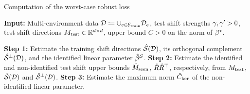 \begin{algorithm}[h!]
    \caption{Computation of the worst-case robust loss} \label{alg:id-rob-loss}
    \begin{algorithmic}[1]
    \State \textbf{Input:} Multi-environment data $\mathcal{D} \coloneqq \cup_{e \in \mathcal{E}_{\mathrm{train}}} \mathcal{D}_e$, test shift strengths $\gamma, \gamma' > 0$, test shift directions $M_{\mathrm{test}} \in \mathbb{R}^{d \times d}$, upper bound $C > 0$ on the norm of $\beta^{\star}$.
    
    \State \textbf{Step 1:} Estimate the training shift directions $\hat{\mathcal{S}}(\mathcal{D})$, its  orthogonal complement $\hat{\mathcal{S}}^\perp(\mathcal{D})$, and the identified linear parameter $\hat{\beta}^{\mathcal{S}}$.
    \State \textbf{Step 2:} Estimate the identified and non-identified test shift upper bounds $\hat{M}_{\mathrm{seen}}$, $\hat{R} \hat{R}^\top$, respectively, from $M_{\mathrm{test}}$, $\hat{\mathcal{S}}(\mathcal{D})$ and $\hat{\mathcal{S}}^\perp(\mathcal{D})$.
    \State \textbf{Step 3:} Estimate the maximum norm $\hat{C}_{\mathrm{ker}}$ of the non-identified linear parameter.


\end{algorithmic}
\end{algorithm}
